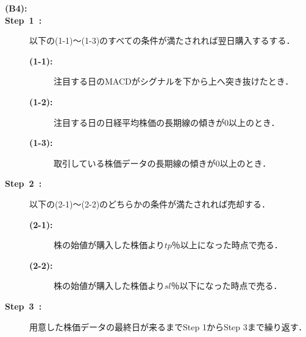 \begin{description}
    \item [\textbf{(B4):}]
    \item[\textbf{Step~1~:}]以下の(1-1)～(1-3)のすべての条件が満たされれば翌日購入するする．
    \begin{description}
      \item[\textbf{(1-1):}]注目する日のMACDがシグナルを下から上へ突き抜けたとき．
      \item[\textbf{(1-2):}]注目する日の日経平均株価の長期線の傾きが0以上のとき．
      \item[\textbf{(1-3):}]取引している株価データの長期線の傾きが0以上のとき． 
     \end{description}  
    
    
    \item[\textbf{Step~2~:}]以下の(2-1)～(2-2)のどちらかの条件が満たされれば売却する．
     \begin{description}
      \item[\textbf{(2-1):}]株の始値が購入した株価より$tp$％以上になった時点で売る．
      \item[\textbf{(2-2):}]株の始値が購入した株価より$sl$％以下になった時点で売る． 
     \end{description}
    \item[\textbf{Step~3~:}]用意した株価データの最終日が来るまでStep 1からStep 3まで繰り返す．

  \end{description}
    
